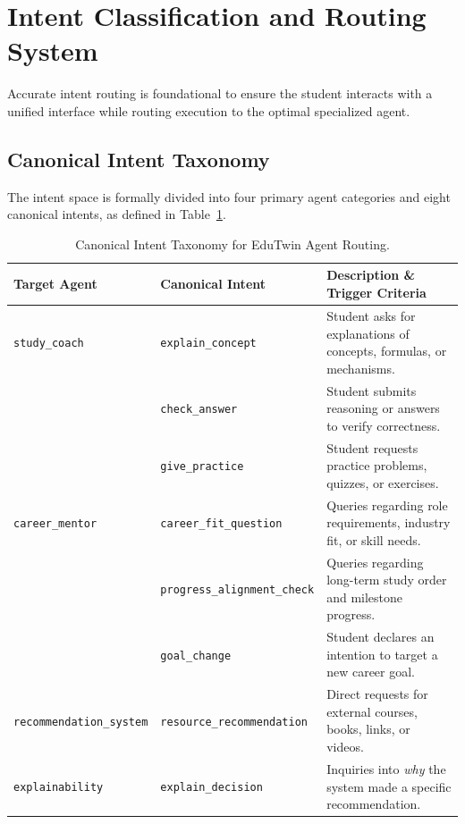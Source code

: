 \documentclass[12pt,a4paper]{article}
\begin{document}
\section{Intent Classification and Routing System}
\label{sec:intent}

Accurate intent routing is foundational to ensure the student interacts with a unified interface while routing execution to the optimal specialized agent.

\subsection{Canonical Intent Taxonomy}
The intent space is formally divided into four primary agent categories and eight canonical intents, as defined in Table~\ref{tab:intent_taxonomy}.

\begin{table}[htbp]
\centering
\small
\renewcommand{\arraystretch}{1.3}
\begin{tabularx}{\textwidth}{l l X}
\toprule
\textbf{Target Agent} & \textbf{Canonical Intent} & \textbf{Description \& Trigger Criteria} \\
\midrule
\texttt{study\_coach} & \texttt{explain\_concept} & Student asks for explanations of concepts, formulas, or mechanisms. \\
& \texttt{check\_answer} & Student submits reasoning or answers to verify correctness. \\
& \texttt{give\_practice} & Student requests practice problems, quizzes, or exercises. \\
\midrule
\texttt{career\_mentor} & \texttt{career\_fit\_question} & Queries regarding role requirements, industry fit, or skill needs. \\
& \texttt{progress\_alignment\_check} & Queries regarding long-term study order and milestone progress. \\
& \texttt{goal\_change} & Student declares an intention to target a new career goal. \\
\midrule
\texttt{recommendation\_system} & \texttt{resource\_recommendation} & Direct requests for external courses, books, links, or videos. \\
\midrule
\texttt{explainability} & \texttt{explain\_decision} & Inquiries into \textit{why} the system made a specific recommendation. \\
\bottomrule
\end{tabularx}
\caption{Canonical Intent Taxonomy for EduTwin Agent Routing.}
\label{tab:intent_taxonomy}
\end{table}
\end{document}
